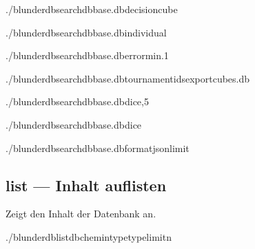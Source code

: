 \documentclass[letterpaper,10pt,german]{sphinxmanual}
\begin{document}
\sphinxAtStartPar
{}

\begin{sphinxVerbatim}[commandchars=\\\{\}]
./blunderdbsearch\PYGZhy{}\PYGZhy{}dbbase.db\PYGZhy{}\PYGZhy{}decisioncube

./blunderdbsearch\PYGZhy{}\PYGZhy{}dbbase.db\PYGZhy{}\PYGZhy{}individual

./blunderdbsearch\PYGZhy{}\PYGZhy{}dbbase.db\PYGZhy{}\PYGZhy{}error\PYGZhy{}min.1

./blunderdbsearch\PYGZhy{}\PYGZhy{}dbbase.db\PYGZhy{}\PYGZhy{}tournament\PYGZhy{}ids\PYGZhy{}\PYGZhy{}exportcubes.db

./blunderdbsearch\PYGZhy{}\PYGZhy{}dbbase.db\PYGZhy{}\PYGZhy{}dice,5

./blunderdbsearch\PYGZhy{}\PYGZhy{}dbbase.db\PYGZhy{}\PYGZhy{}dice

./blunderdbsearch\PYGZhy{}\PYGZhy{}dbbase.db\PYGZhy{}\PYGZhy{}formatjson\PYGZhy{}\PYGZhy{}limit
\end{sphinxVerbatim}


\subsection{list — Inhalt auflisten}
\label{\detokenize{cli:list-lister-le-contenu}}
\sphinxAtStartPar
Zeigt den Inhalt der Datenbank an.

\begin{sphinxVerbatim}[commandchars=\\\{\}]
./blunderdblist\PYGZhy{}\PYGZhy{}db\PYGZlt{}chemin\PYGZgt{}\PYGZhy{}\PYGZhy{}type\PYGZlt{}type\PYGZgt{}\PYG{o}{[}\PYGZhy{}\PYGZhy{}limit\PYGZlt{}n\PYGZgt{}\PYG{o}{]}
\end{sphinxVerbatim}
\end{document}
